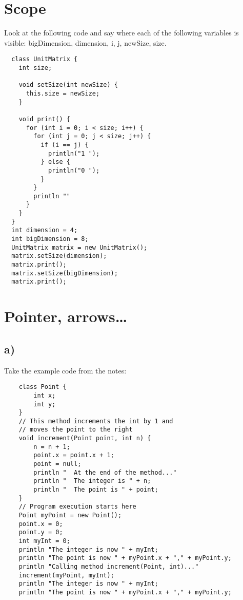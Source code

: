 \documentclass{article}
\begin{document}
\section{Scope}
\label{sec:scope}

Look at the following code and say where each of the following
variables is visible: bigDimension, dimension, i, j, newSize, size. 

\begin{verbatim}
  class UnitMatrix {
    int size;
  
    void setSize(int newSize) {
      this.size = newSize;
    }
    
    void print() {
      for (int i = 0; i < size; i++) {
        for (int j = 0; j < size; j++) {
          if (i == j) {
            println("1 ");
          } else {
            println("0 ");
          }
        }
        println ""
      }
    }
  }
  int dimension = 4;
  int bigDimension = 8;
  UnitMatrix matrix = new UnitMatrix();
  matrix.setSize(dimension);
  matrix.print();
  matrix.setSize(bigDimension);
  matrix.print();
\end{verbatim}

\section{Pointer, arrows\ldots}
\label{sec:pointer-arrowsldots}

\subsection{a)}

Take the example code from the notes:  

\begin{verbatim}
    class Point {
        int x;
        int y;
    }
    // This method increments the int by 1 and 
    // moves the point to the right
    void increment(Point point, int n) {
        n = n + 1;
        point.x = point.x + 1;
        point = null;
        println "  At the end of the method..."
        println "  The integer is " + n;
        println "  The point is " + point;
    }
    // Program execution starts here
    Point myPoint = new Point();
    point.x = 0;
    point.y = 0;
    int myInt = 0;
    println "The integer is now " + myInt;
    println "The point is now " + myPoint.x + "," + myPoint.y;
    println "Calling method increment(Point, int)..."
    increment(myPoint, myInt);
    println "The integer is now " + myInt;
    println "The point is now " + myPoint.x + "," + myPoint.y;
\end{verbatim}
\end{document}
